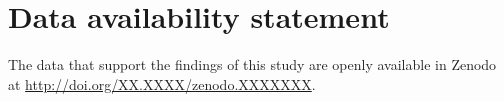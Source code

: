 \documentclass[aip,jcp,reprint,noshowkeys,superscriptaddress]{revtex4-1}
\begin{document}
\section*{Data availability statement}
The data that support the findings of this study are openly available in Zenodo at \href{http://doi.org/XX.XXXX/zenodo.XXXXXXX}{http://doi.org/XX.XXXX/zenodo.XXXXXXX}.


\end{document}
